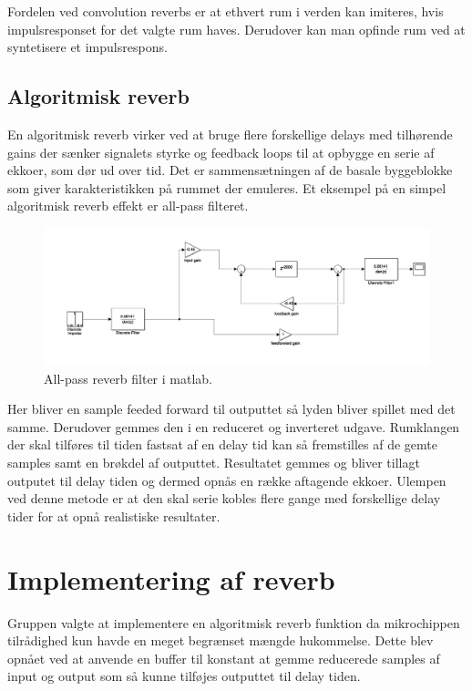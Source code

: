 Fordelen ved convolution reverbs er at ethvert rum i verden kan imiteres, hvis impulsresponset for det valgte rum haves.\newline
Derudover kan man opfinde rum ved at syntetisere et impulsrespons.

\subsection{Algoritmisk reverb}
En algoritmisk reverb virker ved at bruge flere forskellige delays med tilhørende gains der sænker signalets styrke og feedback loops til at opbygge en serie af ekkoer, som dør ud over tid.
Det er sammensætningen af de basale byggeblokke som giver karakteristikken på rummet der emuleres.\newline
Et eksempel på en simpel algoritmisk reverb effekt er all-pass filteret.
\begin{figure}[h]
\includegraphics[width=0.8\linewidth]{./billeder/reverb-testopsaetning.png}
\caption{All-pass reverb filter i matlab.}
\label{fig:allPassMatLab}
\end{figure}
Her bliver en sample feeded forward til outputtet så lyden bliver spillet med det samme.
Derudover gemmes den i en reduceret og inverteret udgave. %
Rumklangen der skal tilføres til tiden fastsat af en delay tid kan så fremstilles af de gemte samples samt en brøkdel af outputtet.
Resultatet gemmes og bliver tillagt outputet til delay tiden og dermed opnås en række aftagende ekkoer.
Ulempen ved denne metode er at den skal serie kobles flere gange med forskellige delay tider for at opnå realistiske resultater.




\section{Implementering af reverb}
Gruppen valgte at implementere en algoritmisk reverb funktion da mikrochippen tilrådighed kun havde en meget begrænset mængde hukommelse.
Dette blev opnået ved at anvende en buffer til konstant at gemme reducerede samples af input og output som så kunne tilføjes outputtet til delay tiden.

